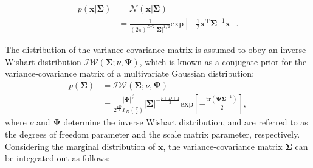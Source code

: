 \documentclass[journal]{IEEEtran}
\begin{document}
\begin{align}
	p(\mathbf{x}|{\mathbf{\Sigma}}) &= {\mathcal N}(\mathbf{x}|{\mathbf{\Sigma}}) \nonumber\\
&= \frac{1}{(2\pi)^{D/2} |\mathbf{\Sigma}|^{1/2}} \mathrm{exp} \left[-\frac{1}{2}\mathbf{x}^\mathrm{T} {\mathbf{\Sigma}}^{-1} \mathbf{x}\right]. \label{eq:gauss_x} %
\end{align}

The distribution of the variance-covariance matrix is assumed to obey an inverse Wishart distribution ${\mathcal {IW}}(\mathbf{\Sigma}; \nu, \mathbf{\Psi})$, which is known as a conjugate prior for the variance-covariance matrix of a multivariate Gaussian distribution:
%
\begin{align}
	p(\mathbf{\Sigma}) &= {\mathcal {IW}}(\mathbf{\Sigma};\nu,\mathbf{\Psi}) \nonumber\\
&= \frac{|\mathbf{\Psi}|^{\frac{\nu}{2}}}{2^{\frac{\nu D}{2}} \Gamma_D \left(\frac{\nu}{2}\right)} |\mathbf{\Sigma}|^{-\frac{\nu+D+1}{2}} \mathrm{exp} \left[-\frac{\mathrm{tr}(\mathbf{\Psi} \mathbf{\Sigma}^{-1})}{2}\right],\label{eq:p_sigma} %
\end{align}
%
where $\nu$ and $\mathbf{\Psi}$ determine the inverse Wishart distribution, and are referred to as the degrees of freedom parameter and the scale matrix parameter, respectively.
Considering the marginal distribution of $\mathbf{x}$, the variance-covariance matrix $\mathbf{\Sigma}$ can be integrated out as follows:
\end{document}
